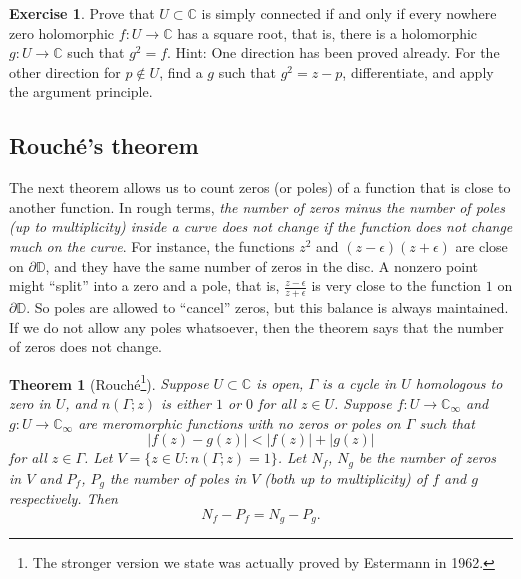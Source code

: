 \documentclass[12pt,openany]{book}
\newcommand{\sabs}[1]{\lvert {#1} \rvert}
\newcommand{\C}{{\mathbb{C}}}
\newcommand{\D}{{\mathbb{D}}}
\newcommand{\myquote}[1]{``#1''}
\theoremstyle{plain}
\newtheorem{thm}{Theorem}[section]
\theoremstyle{remark}
\theoremstyle{definition}
\newenvironment{exbox}{%
    \def\FrameCommand{\vrule width 1pt \relax\hspace{10pt}}%
    \MakeFramed{\advance\hsize-\width\FrameRestore}%
}{%
    \endMakeFramed
}
\theoremstyle{exercise}
\newtheorem{exercise}{Exercise}[section]
\theoremstyle{example}
\begin{document}
\begin{exbox}
\begin{exercise}
Prove that $U \subset \C$ is simply connected if and only if every nowhere
zero holomorphic $f \colon U \to \C$ has a square root, that is, there is a
holomorphic $g \colon U \to \C$ such that $g^2=f$.  Hint: One direction has
been proved already.  For the other direction for $p \notin U$,
find a $g$ such that $g^2 = z-p$, differentiate, and apply the argument
principle.
\end{exercise}
\end{exbox}

\subsection{Rouch\'e's theorem}

The next theorem allows us to count zeros (or poles) of a function that is
close to another function.  In rough terms,
\emph{the number of zeros minus the
number of poles (up to multiplicity) inside a curve does not change
if the function does not change much on the curve}.
For instance, the functions $z^2$ and $(z-\epsilon)(z+\epsilon)$
are close on $\partial \D$, and they have the same number of
zeros in the disc.
A nonzero point might \myquote{split} into a zero and a
pole, that is, $\frac{z-\epsilon}{z+\epsilon}$ is very close to the function
$1$ on $\partial \D$.  So poles are allowed to \myquote{cancel} zeros, but this
balance is always maintained.  If we do not allow any poles
whatsoever, then the theorem says that the number of zeros does not change.

\begin{thm}[Rouch\'e\footnote{%
The stronger version we state was actually proved by Estermann in 1962.}]\label{thm:rouche}
\pagebreak[2]
Suppose $U \subset \C$ is open, $\Gamma$ is a cycle
in $U$ homologous to zero in $U$,
and $n(\Gamma;z)$ is either $1$ or $0$ for all $z \in U$.
Suppose $f \colon U \to \C_\infty$ and $g \colon U \to \C_\infty$
are meromorphic functions with no zeros or poles on
$\Gamma$ such that
\begin{equation*}
\sabs{f(z)-g(z)} < \sabs{f(z)}+\sabs{g(z)}
\end{equation*}
for all $z \in \Gamma$.
Let $V = \bigl\{ z \in U : n(\Gamma;z) = 1 \bigr\}$.
Let $N_f$, $N_g$ be the number of zeros in $V$
and $P_f$, $P_g$ the number of poles in $V$ (both up to multiplicity)
of $f$ and $g$ respectively.
Then
\begin{equation*}
N_f - P_f = 
N_g - P_g.
\end{equation*}
\end{thm}
\end{document}

